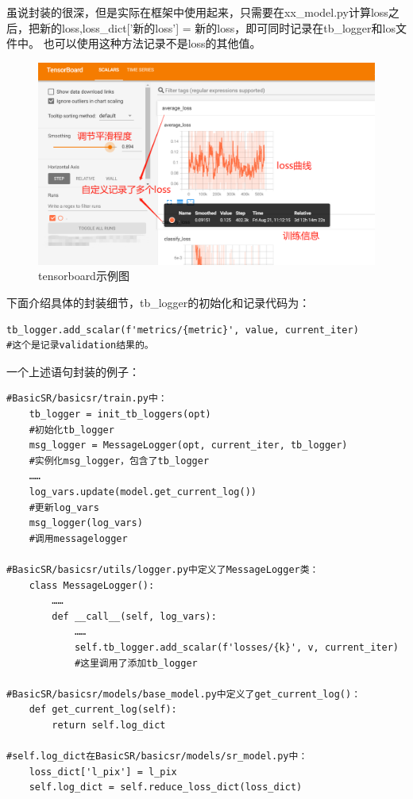 \documentclass[../main.tex]{subfiles}
\begin{document}
\begin{hl} %
虽说封装的很深，但是实际在框架中使用起来，只需要在xx\_model.py计算loss之后，把新的loss,loss\_dict['新的loss'] = 新的loss，即可同时记录在tb\_logger和los文件中。
也可以使用这种方法记录不是loss的其他值。
\end{hl}

\begin{figure}[h]
    \begin{center}
        \includegraphics[width=0.8\linewidth]{figures/tensorboard_demo.png}
        \caption{tensorboard示例图}
        \label{fig:tensorboard_demo}
    \end{center}
\end{figure}

下面介绍具体的封装细节，tb\_logger的初始化和记录代码为：

\begin{verbatim}
tb_logger.add_scalar(f'metrics/{metric}', value, current_iter)
#这个是记录validation结果的。
\end{verbatim}

一个上述语句封装的例子：

\begin{verbatim}
#BasicSR/basicsr/train.py中：
    tb_logger = init_tb_loggers(opt)
    #初始化tb_logger
    msg_logger = MessageLogger(opt, current_iter, tb_logger)
    #实例化msg_logger，包含了tb_logger
    ……
    log_vars.update(model.get_current_log())
    #更新log_vars
    msg_logger(log_vars)
    #调用messagelogger

#BasicSR/basicsr/utils/logger.py中定义了MessageLogger类：
    class MessageLogger():
        ……
        def __call__(self, log_vars):
            ……
            self.tb_logger.add_scalar(f'losses/{k}', v, current_iter)
            #这里调用了添加tb_logger
            
#BasicSR/basicsr/models/base_model.py中定义了get_current_log()：
    def get_current_log(self):
        return self.log_dict

#self.log_dict在BasicSR/basicsr/models/sr_model.py中：
    loss_dict['l_pix'] = l_pix
    self.log_dict = self.reduce_loss_dict(loss_dict)
\end{verbatim}
\end{document}
